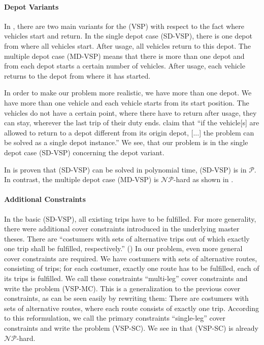 \paragraph{Depot Variants} \parfill 

In \cite{Bunte_Kliewer}, there are two main variants for the (VSP) with respect to the fact where vehicles start and return. In the single depot case (SD-VSP), there is one depot from where all vehicles start. After usage, all vehicles return to this depot. The multiple depot case (MD-VSP) means that there is more than one depot and from each depot starts a certain number of vehicles. After usage, each vehicle returns to the depot from where it has started. 

In order to make our problem more realistic, we have more than one depot. We have more than one vehicle and each vehicle starts from its start position. The vehicles do not have a certain point, where there have to return after usage,  \ie they can stay, wherever the last trip of their duty ends. \cite{Daduna_Paixao} claim that \enquote{if the vehicle[s] are allowed to return to a depot different from its origin depot, [...] the problem can be solved as a single depot instance.} We see, that our problem is in the single depot case (SD-VSP) concerning the depot variant.

In \cite{Dantzig_Fulkerson} is proven that (SD-VSP) can be solved in polynomial time, \ie (SD-VSP) is in $\mathcal{P}$. In contrast, the multiple depot case (MD-VSP) is $\mathcal{NP}$-hard as shown in \cite{Bertossi_Carraresi}.

\paragraph{Additional Constraints} \parfill

In the basic (SD-VSP), all existing trips have to be fulfilled. For more generality, there were additional cover constraints introduced in the underlying master theses. There are \enquote{costumers with sets of alternative trips out of which exactly one trip shall be fulfilled, respectively.} (\cite[p.10]{Kaiser_Knoll}) In our problem, even more general cover constraints are required. We have costumers with sets of alternative routes, consisting of trips; for each costumer, exactly one route has to be fulfilled, \ie each of its trips is fulfilled. We call these constraints \enquote{multi-leg} cover constraints and write the problem (VSP-MC). This is a generalization to the previous cover constraints, as can be seen easily by rewriting them: There are costumers with sets of alternative routes, where each route consists of exactly one trip. According to this reformulation, we call the primary constraints \enquote{single-leg} cover constraints and write the problem (VSP-SC). We see in  that (VSP-SC) is already $\mathcal{NP}$-hard.

